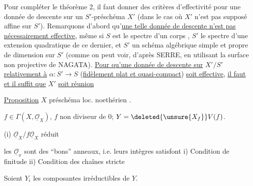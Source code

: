 Pour compléter le théorème 2, il faut donner des critères d'effectivité pour une donnée de descente sur un $S'$-préschéma  $X'$ (dans le cas où $X'$ n'est pas supposé affine sur $S'$). Remarquons d'abord qu'\uline{une telle donnée de descente n'est pas nécessairement effective}, même si $S$ est le spectre d'un corps   , $S'$ le spectre d'une extension quadratique  de ce dernier, et $S'$  un schéma algébrique simple et propre de dimension  sur $S'$ (comme on peut voir, d'après SERRE, en utilisant la surface non projective de NAGATA).  \uline{Pour qu'une donnée de descente sur} $X'/S'$ \uline{relativement à} $\alpha:S'\longrightarrow S$  (\uline{fidèlement plat et quasi-compact}) \uline{soit effective}, \uline{il faut et il suffit que} $X'$ \uline{soit réunion}

\uline{Proposition} $X$ préschéma loc. noethérien .

$f\in\Gamma(X,\underline{\mathcal O}_X)$, $f$ non diviseur de 0; $Y=\deleted{\unsure{X_f}}V(f)$.

(i) $\underline{\mathcal O}_X/f\underline{\mathcal O}_X$ réduit

  les $\underline{\mathcal O}_x$ sont des ``bons'' anneaux, i.e. leurs  intègres satisfont i) Condition de finitude ii) Condition des chaînes stricte

Soient $Y_i$ les composantes irréductibles de $Y$.

